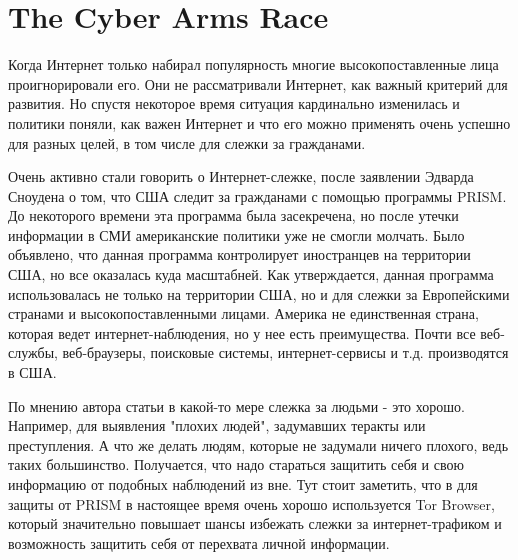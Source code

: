 \documentclass[10pt,a4paper]{article}
\begin{document}
\section{The Cyber Arms Race}
\hspace{0,6cm}Когда Интернет только набирал популярность многие высокопоставленные лица проигнорировали его. Они не рассматривали Интернет, как важный критерий для развития. Но спустя некоторое время ситуация кардинально изменилась и политики поняли, как важен Интернет и что его можно применять очень успешно для разных целей, в том числе для слежки за гражданами.

Очень активно стали говорить о Интернет-слежке, после заявлении Эдварда Сноудена о том, что США следит за гражданами с помощью программы PRISM. До некоторого времени эта программа была засекречена, но после утечки информации в СМИ американские политики уже не смогли молчать. Было объявлено, что данная программа контролирует иностранцев на территории США, но все оказалась куда масштабней. Как утверждается, данная программа использовалась не только на территории США, но и для слежки за Европейскими странами и высокопоставленными лицами.
Америка не единственная страна, которая ведет интернет-наблюдения, но у нее есть преимущества. Почти все веб-службы, веб-браузеры, поисковые системы, интернет-сервисы и т.д. производятся в США. 

По мнению автора статьи в какой-то мере слежка за людьми - это хорошо. Например, для выявления "плохих людей", задумавших теракты или преступления. А что же делать людям, которые не задумали ничего плохого, ведь таких большинство. Получается, что надо стараться защитить себя и свою информацию от подобных наблюдений из вне. Тут стоит заметить, что в для защиты от PRISM в настоящее время очень хорошо используется Tor Browser, который значительно повышает шансы избежать слежки за интернет-трафиком и возможность защитить себя от перехвата личной информации.
\end{document}

